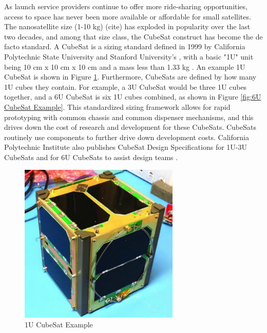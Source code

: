 As launch service providers continue to offer more ride-sharing opportunities, access to space has never been more available or affordable for small satellites. The nanosatellite size (1-10 kg) (cite) has exploded in popularity over the last two decades, and among that size class, the CubeSat construct has become the de facto standard. A CubeSat is a sizing standard defined in 1999 by California Polytechnic State University and Stanford University's , with a basic "1U" unit being 10 cm x 10 cm x 10 cm and a mass less than 1.33 kg \citep{DesignSpec}. An example 1U CubeSat is shown in Figure \ref{fig:1U CubeSat Example}. Furthermore, CubeSats are defined by how many 1U cubes they contain. For example, a 3U CubeSat would be three 1U cubes together, and a 6U CubeSat is six 1U cubes combined, as shown in Figure \ref{fig:6U CubeSat Example}. This standardized sizing framework allows for rapid prototyping with common chassis and common dispenser mechanisms, and this drives down the cost of research and development for these CubeSats. CubeSats routinely use  components to further drive down development costs. California Polytechnic Institute also publishes CubeSat Design Specifications for 1U-3U CubeSats and for 6U CubeSats to assist design teams \citep{DesignSpec}.

\begin{figure}[!h]
    \centering
    \includegraphics[width=3in]{Thesis/Literature_Review/Lit Review Figures/vanderbiltcubesat.jpg}
    \caption{1U CubeSat Example}
    \label{fig:1U CubeSat Example}
\end{figure}

